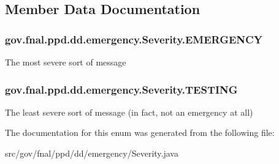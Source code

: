 \subsection{Member Data Documentation}
\hypertarget{enumgov_1_1fnal_1_1ppd_1_1dd_1_1emergency_1_1Severity_a611bc0cf1463a7419a9d2cd14c683578}{
\subsubsection[{E\-M\-E\-R\-G\-E\-N\-C\-Y}]{\setlength{\rightskip}{0pt plus 5cm}gov.\-fnal.\-ppd.\-dd.\-emergency.\-Severity.\-E\-M\-E\-R\-G\-E\-N\-C\-Y}}\label{enumgov_1_1fnal_1_1ppd_1_1dd_1_1emergency_1_1Severity_a611bc0cf1463a7419a9d2cd14c683578}
The most severe sort of message \hypertarget{enumgov_1_1fnal_1_1ppd_1_1dd_1_1emergency_1_1Severity_ac5e5ede059fb831322252943bb24a7d5}{
\subsubsection[{T\-E\-S\-T\-I\-N\-G}]{\setlength{\rightskip}{0pt plus 5cm}gov.\-fnal.\-ppd.\-dd.\-emergency.\-Severity.\-T\-E\-S\-T\-I\-N\-G}}\label{enumgov_1_1fnal_1_1ppd_1_1dd_1_1emergency_1_1Severity_ac5e5ede059fb831322252943bb24a7d5}
The least severe sort of message (in fact, not an emergency at all) 

The documentation for this enum was generated from the following file\-:\begin{DoxyCompactItemize}
\item 
src/gov/fnal/ppd/dd/emergency/Severity.\-java\end{DoxyCompactItemize}
